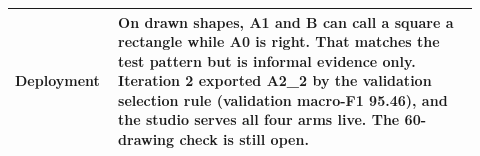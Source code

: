 \begin{tabular}{p{0.18\linewidth}p{0.74\linewidth}}
Deployment & On drawn shapes, A1 and B can call a square a rectangle while A0 is right. That matches the test pattern but is informal evidence only. Iteration 2 exported A2\_2 by the validation selection rule (validation macro-F1 95.46), and the studio serves all four arms live. The 60-drawing check is still open. \\
\bottomrule
\end{tabular}
